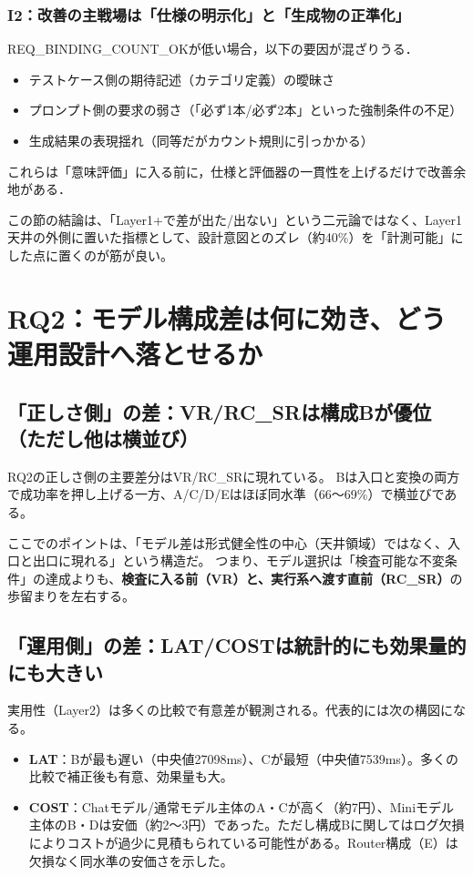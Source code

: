 \documentclass[senior,final,11pt,dvipdfmx]{iputit-thesis}
\begin{document}
\subsubsection{I2：改善の主戦場は「仕様の明示化」と「生成物の正準化」}
REQ\_BINDING\_COUNT\_OKが低い場合，以下の要因が混ざりうる．
\begin{itemize}
  \item テストケース側の期待記述（カテゴリ定義）の曖昧さ
  \item プロンプト側の要求の弱さ（「必ず1本/必ず2本」といった強制条件の不足）
  \item 生成結果の表現揺れ（同等だがカウント規則に引っかかる）
\end{itemize}
これらは「意味評価」に入る前に，仕様と評価器の一貫性を上げるだけで改善余地がある．

この節の結論は、「Layer1+で差が出た/出ない」という二元論ではなく、Layer1天井の外側に置いた指標として、設計意図とのズレ（約40\%）を「計測可能」にした点に置くのが筋が良い。

\section{RQ2：モデル構成差は何に効き、どう運用設計へ落とせるか}
\label{sec:disc_rq2}

\subsection{「正しさ側」の差：VR/RC\_SRは構成Bが優位（ただし他は横並び）}
\label{subsec:disc_rq2_correctness}

RQ2の正しさ側の主要差分はVR/RC\_SRに現れている。
Bは入口と変換の両方で成功率を押し上げる一方、A/C/D/Eはほぼ同水準（66〜69\%）で横並びである。

ここでのポイントは、「モデル差は形式健全性の中心（天井領域）ではなく、入口と出口に現れる」という構造だ。
つまり、モデル選択は「検査可能な不変条件」の達成よりも、\textbf{検査に入る前（VR）と、実行系へ渡す直前（RC\_SR）}の歩留まりを左右する。

\subsection{「運用側」の差：LAT/COSTは統計的にも効果量的にも大きい}
\label{subsec:disc_rq2_operational}

実用性（Layer2）は多くの比較で有意差が観測される。代表的には次の構図になる。
\begin{itemize}
\item \textbf{LAT}：Bが最も遅い（中央値27098ms）、Cが最短（中央値7539ms）。多くの比較で補正後も有意、効果量も大。
\item \textbf{COST}：Chatモデル/通常モデル主体のA・Cが高く（約7円）、Miniモデル主体のB・Dは安価（約2〜3円）であった。ただし構成Bに関してはログ欠損によりコストが過少に見積もられている可能性がある。Router構成（E）は欠損なく同水準の安価さを示した。
\end{itemize}
\end{document}
